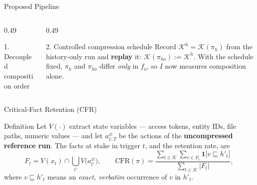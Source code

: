 \documentclass[usenames,dvipsnames,aspectratio=169,10pt]{beamer}
\begin{document}
\begin{frame}{Proposed Pipeline}
\begin{columns}[T]
\begin{column}{0.49\textwidth}
\begin{block}{1. Decoupled composition order}
\end{block}
\end{column}
\begin{column}{0.49\textwidth}
\begin{block}{2. Controlled compression schedule}
\footnotesize
Record $\mathcal{K}^{h}=\mathcal{K}(\pi_h)$ from the history-only run and
\textbf{replay} it: $\mathcal{K}(\pi_{ho}):=\mathcal{K}^{h}$.
With the schedule fixed, $\pi_h$ and $\pi_{ho}$ differ \emph{only} in $f_o$,
so $I$ now measures composition alone.
\end{block}
\end{column}
\end{columns}
\end{frame}

\begin{frame}{Critical-Fact Retention (CFR)}
\begin{block}{Definition}
\footnotesize
Let $V(\cdot)$ extract state variables --- access tokens, entity IDs, file
paths, numeric values --- and let $a^{\varnothing}_{1:T}$ be the actions of the
\textbf{uncompressed reference run}. The facts at stake in trigger $t$, and the
retention rate, are
\vspace{-0.2cm}
\[
F_t=V(x_t)\cap\bigcup_{t'}V\big(a^{\varnothing}_{t'}\big),
\qquad
\mathrm{CFR}(\pi)=\frac{\sum_{t\in\mathcal{K}}\sum_{v\in F_t}
   \mathbf{1}\big[v\sqsubseteq h'_t\big]}{\sum_{t\in\mathcal{K}}|F_t|},
\]
\vspace{-0.25cm}
\footnotesize
where $v\sqsubseteq h'_t$ means an \emph{exact, verbatim} occurrence of $v$ in $h'_t$.
\end{block}


\end{frame}
\end{document}
